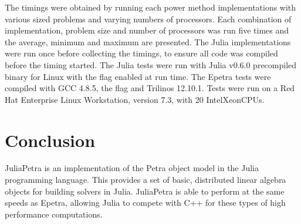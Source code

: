 \documentclass[acmsmall]{acmart}
\newcommand{\juliaSnippet}[1]{\texttt{\detokenize{#1}}}
\let\oldtextregister\textregistered
\renewcommand{\textregistered}{\textsuperscript{\tiny\oldtextregister}}
\begin{document}
The timings were obtained by running each power method implementations
with various sized problems and varying numbers of processors.
Each combination of implementation, problem size and number of processors was run five times
and the average, minimum and maximum are presented.
The Julia implementations were run once before collecting the timings, to ensure all code was
compiled before the timing started.
The Julia tests were run with Julia v0.6.0 precompiled binary for Linux
with the \juliaSnippet{-O3} flag enabled at run time.
The Epetra tests were compiled with GCC 4.8.5, the \juliaSnippet{-O3} flag and Trilinos 12.10.1.
Tests were run on a Red Hat Enterprise Linux Workstation, version 7.3,
with 20 Intel\textregistered Xeon\textregistered CPUs.


\section{Conclusion}

JuliaPetra is an implementation of the Petra object model in the Julia programming language.
This provides a set of basic, distributed linear algebra objects for building solvers in Julia.
JuliaPetra is able to perform at the same speeds as Epetra,
allowing Julia to compete with C++ for these types of high performance computations.


\end{document}
